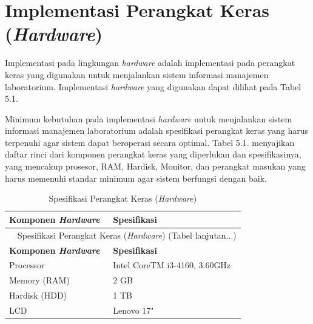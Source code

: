 \section{Implementasi Perangkat Keras (\textit{Hardware})}
Implementasi pada lingkungan \textit{hardware} adalah implementasi pada perangkat keras yang digunakan untuk menjalankan sistem informasi manajemen laboratorium. Implementasi \textit{hardware} yang digunakan dapat dilihat pada Tabel 5.1.

Minimum kebutuhan pada implementasi \textit{hardware} untuk menjalankan sistem informasi manajemen laboratorium adalah spesifikasi perangkat keras yang harus terpenuhi agar sistem dapat beroperasi secara optimal. Tabel 5.1. menyajikan daftar rinci dari komponen perangkat keras yang diperlukan dan spesifikasinya, yang mencakup prosesor, RAM, Hardisk, Monitor, dan perangkat masukan yang harus memenuhi standar minimum agar sistem berfungsi dengan baik.

\begin{longtable}{l l}
	\caption{Spesifikasi Perangkat Keras (\textit{Hardware})}                                                               \\
	\hline
	\textbf{Komponen \textit{Hardware}} & \textbf{Spesifikasi}                                                              \\
	\hline
	\endfirsthead

	\multicolumn{2}{c}{\tablename\ \thetable\ {Spesifikasi Perangkat Keras (\textit{Hardware})} \space (Tabel lanjutan...)} \\
	\hline
	\textbf{Komponen \textit{Hardware}} & \textbf{Spesifikasi}                                                              \\
	\hline
	\endhead

	Processor                           & Intel \textregistered{} CoreTM i3-4160, 3.60GHz                                   \\
	Memory (RAM)                        & 2 GB                                                                              \\
	Hardisk (HDD)                       & 1 TB                                                                              \\
	LCD                                 & Lenovo 17"                                                                        \\
	\hline
\end{longtable}

